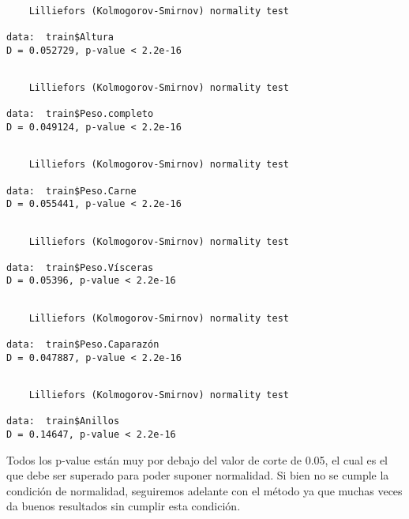 \documentclass[11pt]{article}
\begin{document}
    \begin{verbatim}

	Lilliefors (Kolmogorov-Smirnov) normality test

data:  train$Altura
D = 0.052729, p-value < 2.2e-16

    \end{verbatim}

    
    
    \begin{verbatim}

	Lilliefors (Kolmogorov-Smirnov) normality test

data:  train$Peso.completo
D = 0.049124, p-value < 2.2e-16

    \end{verbatim}

    
    
    \begin{verbatim}

	Lilliefors (Kolmogorov-Smirnov) normality test

data:  train$Peso.Carne
D = 0.055441, p-value < 2.2e-16

    \end{verbatim}

    
    
    \begin{verbatim}

	Lilliefors (Kolmogorov-Smirnov) normality test

data:  train$Peso.Vísceras
D = 0.05396, p-value < 2.2e-16

    \end{verbatim}

    
    
    \begin{verbatim}

	Lilliefors (Kolmogorov-Smirnov) normality test

data:  train$Peso.Caparazón
D = 0.047887, p-value < 2.2e-16

    \end{verbatim}

    
    
    \begin{verbatim}

	Lilliefors (Kolmogorov-Smirnov) normality test

data:  train$Anillos
D = 0.14647, p-value < 2.2e-16

    \end{verbatim}

    
    Todos los p-value están muy por debajo del valor de corte de 0.05, el
cual es el que debe ser superado para poder suponer normalidad. Si bien
no se cumple la condición de normalidad, seguiremos adelante con el
método ya que muchas veces da buenos resultados sin cumplir esta
condición.
\end{document}
